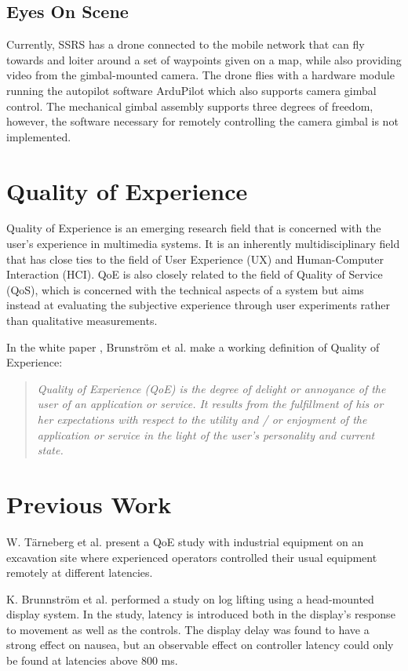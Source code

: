 \documentclass[nofilelist]{cslthse-msc}
\begin{document}
\subsection{Eyes On Scene}
Currently, SSRS has a drone connected to the mobile network that can fly towards and loiter around a set of waypoints given on a map, while also providing video from the gimbal-mounted camera. The drone flies with a hardware module running the autopilot software ArduPilot which also supports camera gimbal control. The mechanical gimbal assembly supports three degrees of freedom, however, the software necessary for remotely controlling the camera gimbal is not implemented.

\section{Quality of Experience}
Quality of Experience is an emerging research field that is concerned with the user's experience in multimedia systems. It is an inherently multidisciplinary field that has close ties to the field of User Experience (UX) and Human-Computer Interaction (HCI). QoE is also closely related to the field of Quality of Service (QoS), which is concerned with the technical aspects of a system but aims instead at evaluating the subjective experience through user experiments rather than qualitative measurements.

In the white paper \cite{qoe-definition}, Brunström et al. make a working definition of Quality of Experience: 

\begin{quote}
   \textit{Quality of Experience (QoE) is the degree of delight or annoyance of the user of an application or service. It results from the fulfillment of his or her expectations with respect to the utility and / or enjoyment of the application or service in the light of the user’s personality and current state.} 
\end{quote}


\section{Previous Work}

W. Tärneberg et al. \cite{industry4.0} present a QoE study with industrial equipment on an excavation site where experienced operators controlled their usual equipment remotely at different latencies. 

K. Brunnström et al. \cite{latency-impact} performed a study on log lifting using a head-mounted display system. In the study, latency is introduced both in the display's response to movement as well as the controls. The display delay was found to have a strong effect on nausea, but an observable effect on controller latency could only be found at latencies above 800 ms. 
\end{document}
